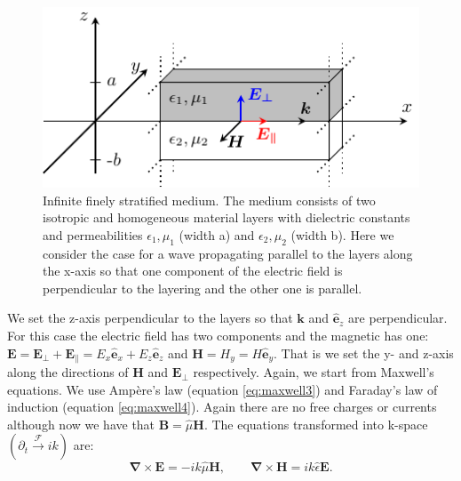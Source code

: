 \begin{figure}[h]
    \centering
    \includegraphics[scale=1.5]{images/theory/tikz_rytov_derivation.pdf}
    \caption{Infinite finely stratified medium. The medium consists of two isotropic and homogeneous material layers with dielectric constants and permeabilities $\epsilon_1, \mu_1$ (width a) and $\epsilon_2, \mu_2$ (width b). Here we consider the case for a wave propagating parallel to the layers along the x-axis so that one component of the electric field is perpendicular to the layering and the other one is parallel.}
    \label{fig:tikz_rytov_derivation}
\end{figure}

We set the z-axis perpendicular to the layers so that $\bm{k}$ and $\hat{\bm{e}}_z$ are perpendicular. For this case the electric field has two components and the magnetic has one: $\bm{E}=\bm{E_{\bot}} + \bm{E_{\parallel}} = E_x \hat{\bm{e}}_x + E_{z} \hat{\bm{e}}_z$ and $\bm{H}=H_y=H \hat{\bm{e}}_y$. That is we set the y- and z-axis along the directions of $\bm{H}$ and $\bm{E_{\bot}}$ respectively. Again, we start from Maxwell's equations. We use Ampère's law (equation \ref{eq:maxwell3}) and Faraday's law of induction (equation \ref{eq:maxwell4}). Again there are no free charges or currents although now we have that $\bm{B} = \hat{\mu} \bm{H}$. The equations transformed into k-space $(\partial_t \xrightarrow{\mathscr{F}} ik)$ are:
\begin{equation}
    \label{eq:rytov_maxwell_initial}
    \bm{\nabla}\times\bm{E} =-ik \hat{\mu} \bm{H},
    \qquad
    \bm{\nabla}\times\bm{H} = ik \hat{\epsilon} \bm{E}.
\end{equation}

